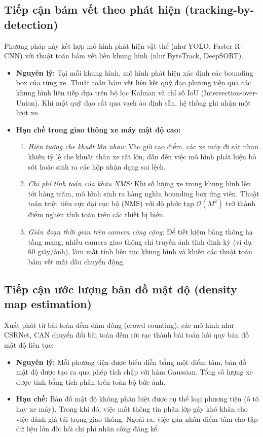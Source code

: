 \subsection{Tiếp cận bám vết theo phát hiện (tracking-by-detection)}
Phương pháp này kết hợp mô hình phát hiện vật thể (như YOLO, Faster R-CNN) với thuật toán bám vết liên khung hình (như ByteTrack, DeepSORT).
\begin{itemize}
    \item \textbf{Nguyên lý:} Tại mỗi khung hình, mô hình phát hiện xác định các bounding box của từng xe. Thuật toán bám vết liên kết quỹ đạo phương tiện qua các khung hình liên tiếp dựa trên bộ lọc Kalman và chỉ số IoU (Intersection-over-Union). Khi một quỹ đạo cắt qua vạch ảo định sẵn, hệ thống ghi nhận một lượt xe.
    \item \textbf{Hạn chế trong giao thông xe máy mật độ cao:}
    \begin{enumerate}
        \item \textit{Hiện tượng che khuất lẫn nhau:} Vào giờ cao điểm, các xe máy đi sát nhau khiến tỷ lệ che khuất thân xe rất lớn, dẫn đến việc mô hình phát hiện bỏ sót hoặc sinh ra các hộp nhận dạng sai lệch.
        \item \textit{Chi phí tính toán của khâu NMS:} Khi số lượng xe trong khung hình lên tới hàng trăm, mô hình sinh ra hàng nghìn bounding box ứng viên. Thuật toán triệt tiêu cực đại cục bộ (NMS) với độ phức tạp $\mathcal{O}(M^2)$ trở thành điểm nghẽn tính toán trên các thiết bị biên.
        \item \textit{Gián đoạn thời gian trên camera công cộng:} Để tiết kiệm băng thông hạ tầng mạng, nhiều camera giao thông chỉ truyền ảnh tĩnh định kỳ (ví dụ 60 giây/ảnh), làm mất tính liên tục khung hình và khiến các thuật toán bám vết mất dấu chuyển động.
    \end{enumerate}
\end{itemize}

\subsection{Tiếp cận ước lượng bản đồ mật độ (density map estimation)}
Xuất phát từ bài toán đếm đám đông (crowd counting), các mô hình như CSRNet, CAN chuyển đổi bài toán đếm rời rạc thành bài toán hồi quy bản đồ mật độ liên tục:
\begin{itemize}
    \item \textbf{Nguyên lý:} Mỗi phương tiện được biểu diễn bằng một điểm tâm, bản đồ mật độ được tạo ra qua phép tích chập với hàm Gaussian. Tổng số lượng xe được tính bằng tích phân trên toàn bộ bức ảnh.
    \item \textbf{Hạn chế:} Bản đồ mật độ không phân biệt được cụ thể loại phương tiện (ô tô hay xe máy). Trong khi đó, việc mất thông tin phân lớp gây khó khăn cho việc đánh giá tải trọng giao thông. Ngoài ra, việc gán nhãn điểm tâm cho tập dữ liệu lớn đòi hỏi chi phí nhân công đáng kể.
\end{itemize}

